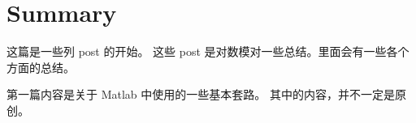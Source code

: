 
\section{Summary}
\label{sec:summary}
这篇是一些列 post 的开始。
这些 post 是对数模对一些总结。里面会有一些各个方面的总结。

第一篇内容是关于 Matlab 中使用的一些基本套路。
其中的内容，并不一定是原创。
\endinput
